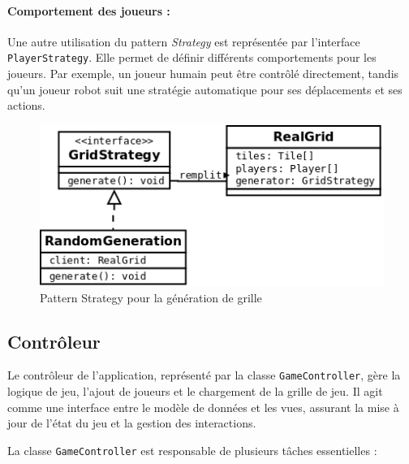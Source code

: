\documentclass[12pt]{article}
\begin{document}
\paragraph{Comportement des joueurs :}
Une autre utilisation du pattern \textit{Strategy} est représentée par l'interface \texttt{PlayerStrategy}. Elle permet de définir différents comportements pour les joueurs. Par exemple, un joueur humain peut être contrôlé directement, tandis qu'un joueur robot suit une stratégie automatique pour ses déplacements et ses actions.

\begin{figure}[!h] \centering \includegraphics[scale=0.5]{images/strategy.png} \caption{Pattern Strategy pour la génération de grille} \end{figure}

\subsection{Contrôleur}

Le contrôleur de l'application, représenté par la classe \texttt{GameController}, gère la logique de jeu, l'ajout de joueurs et le chargement de la grille de jeu. Il agit comme une interface entre le modèle de données et les vues, assurant la mise à jour de l'état du jeu et la gestion des interactions.

La classe \texttt{GameController} est responsable de plusieurs tâches essentielles :
\end{document}
